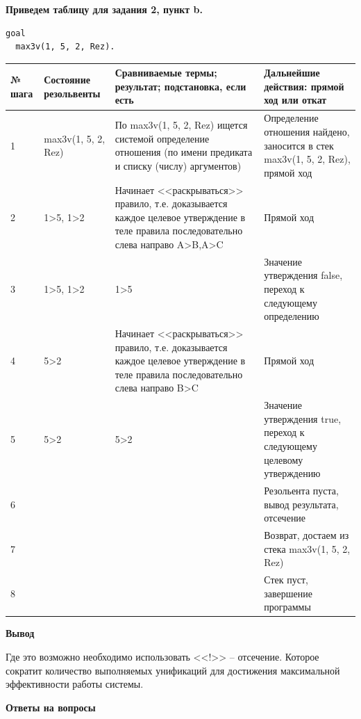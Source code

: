 \documentclass[a4paper,14pt]{extreport} %
\begin{document}
\hfill

\textbf{Приведем таблицу для задания 2, пункт b. }
\begin{lstlisting}
goal
  max3v(1, 5, 2, Rez).
\end{lstlisting}

\begin{longtable}{|p{0.5cm}|p{4cm}|p{7cm}|p{5.5cm}|}
	\hline
 	№ шага & Состояние резольвенты & Сравниваемые термы; результат; подстановка, если есть  & Дальнейшие действия: прямой ход или откат \\ \hline
	1 & max3v(1, 5, 2, Rez) & По max3v(1, 5, 2, Rez) ищется системой определение отношения (по имени предиката и списку (числу) аргументов) & Определение отношения найдено, заносится в стек max3v(1, 5, 2, Rez), прямой ход \\ \hline
	2 &1>5, 1>2& Начинает <<раскрываться>> правило, т.е. доказывается каждое целевое утверждение в теле правила последовательно слева направо
	A>B,A>C
	
	& Прямой ход\\ \hline
	
	3 &1>5, 1>2& 1>5	
	& Значение утверждения false, переход к следующему определению\\ \hline

	4 &5>2& Начинает <<раскрываться>> правило, т.е. доказывается каждое целевое утверждение в теле правила последовательно слева направо
	B>C
	
	& Прямой ход\\ \hline
	5 &5>2& 5>2 & Значение утверждения true, переход к следующему целевому утверждению\\ \hline
	6 && & Резольента пуста, вывод результата, отсечение\\ \hline

         7&&&Возврат, достаем из стека max3v(1, 5, 2, Rez)  \\ \hline
	8 & &  & Стек пуст, завершение программы \\ \hline

\end{longtable}

\hfill

\textbf{Вывод}

Где это возможно необходимо использовать <<!>> -- отсечение. Которое сократит количество выполняемых унификаций для достижения максимальной эффективности работы системы. 

\hfill

\textbf{Ответы на вопросы}
\end{document}
